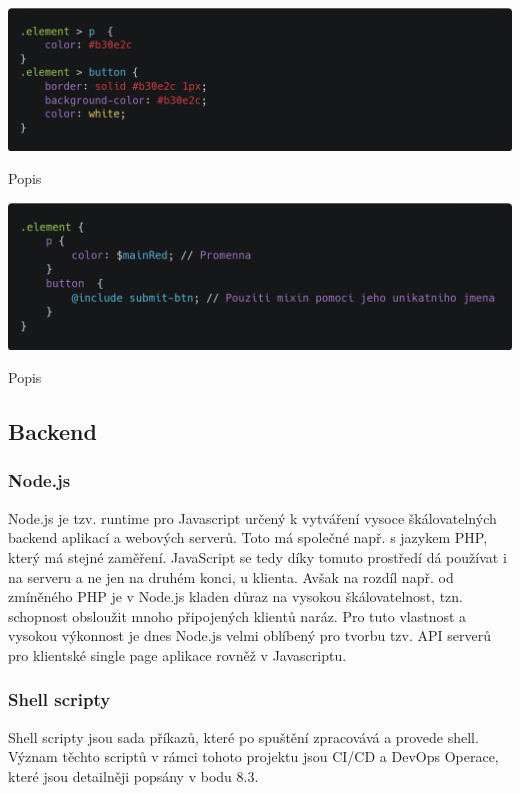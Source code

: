 \documentclass[12pt,a4paper]{report}
\begin{document}
  \vspace*{0.5cm}
  \noindent\includegraphics[width=\linewidth]{cssCodeblock.png}
  \begin{center}
    Popis
  \end{center}

  \vspace*{0.5cm}\vspace*{0.5cm}
  \noindent\includegraphics[width=\linewidth]{scssCodeblock.png}
  \begin{center}
    Popis
  \end{center}
  \vspace*{0.5cm}

  \subsection{Backend}
  \subsubsection{Node.js}
  Node.js je tzv. runtime pro Javascript určený k vytváření vysoce škálovatelných backend aplikací a
  webových serverů. Toto má společné např. s jazykem PHP, který má stejné zaměření. JavaScript se
  tedy díky tomuto prostředí dá používat i na serveru a ne jen na druhém konci, u klienta. Avšak na
  rozdíl např. od zmíněného PHP je v Node.js kladen důraz na vysokou škálovatelnost, tzn.
  schopnost obsloužit mnoho připojených klientů naráz. Pro tuto vlastnost a vysokou výkonnost je
  dnes Node.js velmi oblíbený pro tvorbu tzv. API serverů pro klientské single page aplikace rovněž v
  Javascriptu. 
  \subsubsection{Shell scripty}
  Shell scripty jsou sada příkazů, které po spuštění zpracovává a provede shell. Význam těchto
  scriptů v rámci tohoto projektu jsou CI/CD a DevOps Operace, které jsou detailněji popsány v bodu 8.3.
\end{document}
